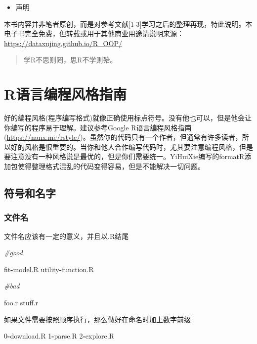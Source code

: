 \documentclass[]{book}
\newenvironment{Shaded}{\begin{snugshade}}{\end{snugshade}}
\newcommand{\DecValTok}[1]{\textcolor[rgb]{0.00,0.00,0.81}{#1}}
\newcommand{\CommentTok}[1]{\textcolor[rgb]{0.56,0.35,0.01}{\textit{#1}}}
\newcommand{\OperatorTok}[1]{\textcolor[rgb]{0.81,0.36,0.00}{\textbf{#1}}}
\newcommand{\NormalTok}[1]{#1}
\providecommand{\tightlist}{%
  \setlength{\itemsep}{0pt}\setlength{\parskip}{0pt}}
\begin{document}
\begin{itemize}
\tightlist
\item
  声明
\end{itemize}

本书内容并非笔者原创，而是对参考文献{[}1-3{]}学习之后的整理再现，特此说明。本电子书完全免费，但转载或用于其他商业用途请说明来源：\url{https://dataxujing.github.io/R_OOP/}

\begin{quote}
学R不思则罔，思R不学则殆。
\end{quote}

\chapter{R语言编程风格指南}\label{ch1}

好的编程风格(程序编写格式)就像正确使用标点符号。没有他也可以，但是他会让你编写的程序易于理解。建议参考Google
R语言编程风格指南(\url{https://nanx.me/rstyle/})。虽然你的代码只有一个作者，但通常有许多读者，所以好的风格是很重要的。当你和他人合作编写代码时，尤其要注意编程风格，但是要注意没有一种风格说是最优的，但是你们需要统一。YiHuiXie编写的formatR添加包使得整理格式混乱的代码变得容易，但是不能解决一切问题。

\section{符号和名字}

\subsection{文件名}

文件名应该有一定的意义，并且以.R结尾

\begin{Shaded}
\begin{Highlighting}[]
\CommentTok{#good}

\NormalTok{fit}\OperatorTok{-}\NormalTok{model.R}
\NormalTok{utility}\OperatorTok{-}\NormalTok{function.R}

\CommentTok{#bad}

\NormalTok{foo.r}
\NormalTok{stuff.r}
\end{Highlighting}
\end{Shaded}

如果文件需要按照顺序执行，那么做好在命名时加上数字前缀

\begin{Shaded}
\begin{Highlighting}[]
\DecValTok{0}\OperatorTok{-}\NormalTok{download.R}
\DecValTok{1}\OperatorTok{-}\NormalTok{parse.R}
\DecValTok{2}\OperatorTok{-}\NormalTok{explore.R}
\end{Highlighting}
\end{Shaded}
\end{document}
